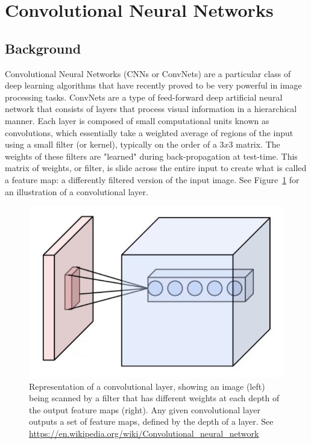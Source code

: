 \documentclass[hidelinks]{article}
\begin{document}

\section{Convolutional Neural Networks}

\subsection{Background}
Convolutional Neural Networks (CNNs or ConvNets) are a particular class of deep learning algorithms that have recently proved to be very powerful in image processing tasks. ConvNets are a type of feed-forward deep artificial neural network that consists of layers that process visual information in a hierarchical manner. Each layer is composed of small computational units known as convolutions, which essentially take a weighted average of regions of the input using a small filter (or kernel), typically on the order of a $3x3$ matrix. The weights of these filters are "learned" during back-propagation at test-time. This matrix of weights, or filter, is slide across the entire input to create what is called a feature map: a differently filtered version of the input image. See Figure~\ref{fig:conv_layer} for an illustration of a convolutional layer.

\begin{figure}[H]
  \centering
  \includegraphics[scale=0.35]{conv_layer}
  \caption{Representation of a convolutional layer, showing an image (left) being scanned by a filter that has different weights at each depth of the output feature maps (right). Any given convolutional layer outputs a set of feature maps, defined by the depth of a layer. See \url{https://en.wikipedia.org/wiki/Convolutional_neural_network}}
  \label{fig:conv_layer}
\end{figure}
\end{document}
